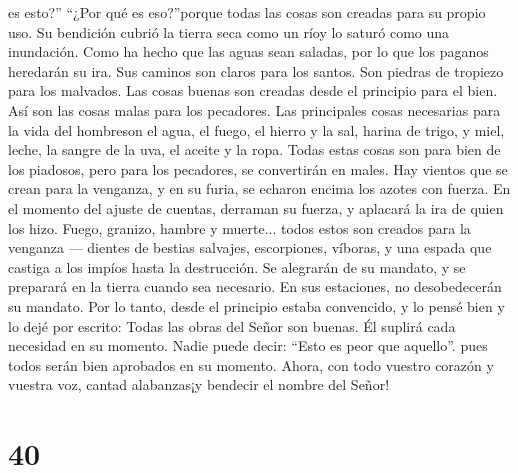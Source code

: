 es esto?'' ``¿Por qué es eso?''porque todas las cosas son creadas para
su propio uso.  Su bendición cubrió la tierra seca como
un ríoy lo saturó como una inundación.  Como ha hecho que
las aguas sean saladas, por lo que los paganos heredarán su ira.
 Sus caminos son claros para los santos. Son piedras de
tropiezo para los malvados.  Las cosas buenas son creadas
desde el principio para el bien. Así son las cosas malas para los
pecadores.  Las principales cosas necesarias para la vida
del hombreson el agua, el fuego, el hierro y la sal, harina de trigo, y
miel, leche, la sangre de la uva, el aceite y la ropa. 
Todas estas cosas son para bien de los piadosos, pero para los
pecadores, se convertirán en males.  Hay vientos que se
crean para la venganza, y en su furia, se echaron encima los azotes con
fuerza. En el momento del ajuste de cuentas, derraman su fuerza, y
aplacará la ira de quien los hizo.  Fuego, granizo,
hambre y muerte... todos estos son creados para la venganza ---
 dientes de bestias salvajes, escorpiones, víboras, y una
espada que castiga a los impíos hasta la destrucción.  Se
alegrarán de su mandato, y se preparará en la tierra cuando sea
necesario. En sus estaciones, no desobedecerán su mandato.
 Por lo tanto, desde el principio estaba convencido, y lo
pensé bien y lo dejé por escrito:  Todas las obras del
Señor son buenas. Él suplirá cada necesidad en su momento.
 Nadie puede decir: ``Esto es peor que aquello''. pues
todos serán bien aprobados en su momento.  Ahora, con
todo vuestro corazón y vuestra voz, cantad alabanzas¡y bendecir el
nombre del Señor!

\hypertarget{section-39}{%
\section{40}\label{section-39}}


